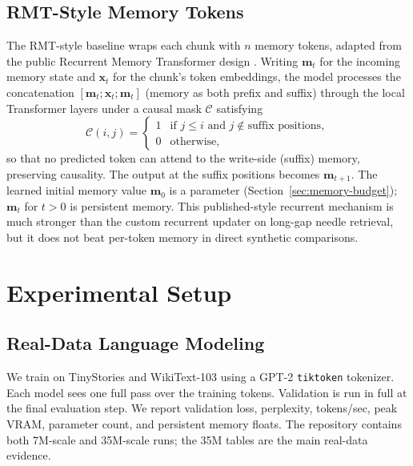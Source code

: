\documentclass[10pt]{article} %
\begin{document}
\subsection{RMT-Style Memory Tokens}
The RMT-style baseline wraps each chunk with $n$ memory tokens, adapted
from the public Recurrent Memory Transformer design
\citep{bulatov2022rmt}. Writing $\mathbf{m}_t$ for the incoming memory
state and $\mathbf{x}_t$ for the chunk's token embeddings, the model
processes the concatenation $[\mathbf{m}_t ; \mathbf{x}_t ; \mathbf{m}_t]$
(memory as both prefix and suffix) through the local Transformer layers
under a causal mask $\mathcal{C}$ satisfying
\begin{equation}
  \mathcal{C}(i,j) = \begin{cases}
    1 & \text{if } j \le i \text{ and } j \notin \text{suffix positions}, \\
    0 & \text{otherwise,}
  \end{cases}
\end{equation}
so that no predicted token can attend to the write-side (suffix) memory,
preserving causality. The output at the suffix positions becomes
$\mathbf{m}_{t+1}$. The learned initial memory value $\mathbf{m}_0$ is a
parameter (Section~\ref{sec:memory-budget}); $\mathbf{m}_t$ for $t>0$ is persistent memory. This
published-style recurrent mechanism is much stronger than the custom
recurrent updater on long-gap needle retrieval, but it does not beat
per-token memory in direct synthetic comparisons.

\section{Experimental Setup}

\subsection{Real-Data Language Modeling}
We train on TinyStories \citep{eldan2023tinystories} and WikiText-103
\citep{merity2017wikitext} using a GPT-2 \texttt{tiktoken} tokenizer. Each
model sees one full pass over the training tokens. Validation is run in
full at the final evaluation step. We report validation loss, perplexity,
tokens/sec, peak VRAM, parameter count, and persistent memory floats. The
repository contains both 7M-scale and 35M-scale runs; the 35M tables are
the main real-data evidence.
\end{document}
